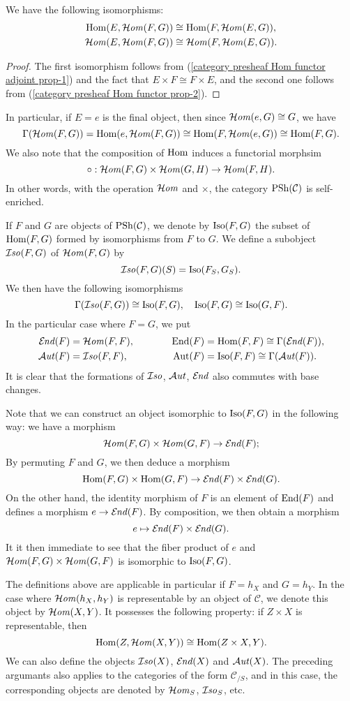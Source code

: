 \begin{corollary}
We have the following isomorphisms:
\begin{align}
\Hom(E,\sHom(F,G))&\cong \Hom(F,\sHom(E,G))\label{category presheaf Hom functor adjoint prop-3},\\
\sHom(E,\sHom(F,G))&\cong \sHom(F,\sHom(E,G))\label{category presheaf Hom functor adjoint prop-4}.
\end{align}
\end{corollary}
\begin{proof}
The first isomorphism follows from (\ref{category presheaf Hom functor adjoint prop-1}) and the fact that $E\times F\cong F\times E$, and the second one follows from (\ref{category presheaf Hom functor prop-2}).
\end{proof}

In particular, if $E=e$ is the final object, then since $\sHom(e,G)\cong G$, we have
\[\Gamma(\sHom(F,G))=\Hom(e,\sHom(F,G))\cong\Hom(F,\sHom(e,G))\cong\Hom(F,G).\]
We also note that the composition of $\Hom$ induces a functorial morphsim
\[\circ:\sHom(F,G)\times\sHom(G,H)\to\sHom(F,H).\]
In other words, with the operation $\sHom$ and $\times$, the category $\PSh(\mathcal{C})$ is self-enriched.\par

If $F$ and $G$ are objects of $\PSh(\mathcal{C})$, we denote by $\Iso(F,G)$ the subset of $\Hom(F,G)$ formed by isomorphisms from $F$ to $G$. We define a subobject $\sIso(F,G)$ of $\sHom(F,G)$ by
\[\sIso(F,G)(S)=\Iso(F_S,G_S).\]
We then have the following isomorphisms
\[\Gamma(\sIso(F,G))\cong\Iso(F,G),\quad \Iso(F,G)\cong\Iso(G,F).\]
In the particular case where $F=G$, we put
\begin{alignat*}{3}
\sEnd(F)&=\sHom(F,F),&\quad\quad &&\End(F)&=\Hom(F,F)\cong\Gamma(\sEnd(F)),\\
\sAut(F)&=\sIso(F,F),&\quad\quad &&\Aut(F)&=\Iso(F,F)\cong\Gamma(\sAut(F)).
\end{alignat*}
It is clear that the formations of $\sIso$, $\sAut$, $\sEnd$ also commutes with base changes.
\begin{remark}
Note that we can construct an object isomorphic to $\Iso(F,G)$ in the following way: we have a morphism
\[\sHom(F,G)\times \sHom(G,F)\to\sEnd(F);\]
By permuting $F$ and $G$, we then deduce a morphism
\[\Hom(F,G)\times\Hom(G,F)\to\sEnd(F)\times\sEnd(G).\]
On the other hand, the identity morphism of $F$ is an element of $\End(F)$ and defines a morphism $e\to\sEnd(F)$. By composition, we then obtain a morphism
\[e\mapsto\sEnd(F)\times\sEnd(G).\]
It it then immediate to see that the fiber product of $e$ and $\sHom(F,G)\times\sHom(G,F)$ is isomorphic to $\Iso(F,G)$.
\end{remark}
The definitions above are applicable in particular if $F=h_X$ and $G=h_Y$. In the case where $\sHom(h_X,h_Y)$ is representable by an object of $\mathcal{C}$, we denote this object by $\sHom(X,Y)$. It possesses the following property: if $Z\times X$ is representable, then 
\[\Hom(Z,\sHom(X,Y))\cong \Hom(Z\times X,Y).\]
We can also define the objects $\sIso(X)$, $\sEnd(X)$ and $\sAut(X)$. The preceding argumants also applies to the categories of the form $\mathcal{C}_{/S}$, and in this case, the corresponding objects are denoted by $\sHom_S$, $\sIso_S$, etc.
